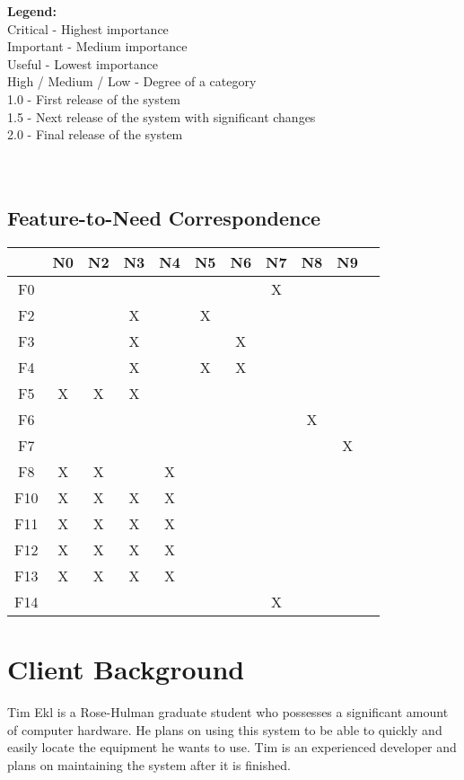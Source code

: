 \documentclass{article}
\begin{document}
\textbf{Legend:} \\
Critical - Highest importance \\
Important - Medium importance \\
Useful - Lowest importance \\
High / Medium / Low - Degree of a category \\
1.0 - First release of the system \\
1.5 - Next release of the system with significant changes \\
2.0 - Final release of the system \\
~\\
~\\
\subsection{Feature-to-Need Correspondence}
\begin{tabular}{ | c || c | c | c | c | c | c | c | c | c | c | }
\hline
    & N0 & N2 & N3 & N4 & N5 & N6 & N7 & N8 & N9 \\
\hline
\hline
F0  &    &    &    &    &    &    & X  &    &    \\
\hline
F2  &    &    & X  &    & X  &    &    &    &    \\
\hline
F3  &    &    & X  &    &    & X  &    &    &    \\
\hline
F4  &    &    & X  &    & X  & X  &    &    &    \\
\hline
F5  & X  & X  & X  &    &    &    &    &    &    \\
\hline
F6  &    &    &    &    &    &    &    & X  &    \\
\hline
F7  &    &    &    &    &    &    &    &    & X  \\
\hline
F8  & X  & X  &    & X  &    &    &    &    &    \\
\hline
F10 & X  & X  & X  & X  &    &    &    &    &    \\
\hline
F11 & X  & X  & X  & X  &    &    &    &    &    \\
\hline
F12 & X  & X  & X  & X  &    &    &    &    &    \\
\hline
F13 & X  & X  & X  & X  &    &    &    &    &    \\
\hline
F14 &    &    &    &    &    &    & X  &    &    \\
\hline
\end{tabular}

\section{Client Background}
Tim Ekl is a Rose-Hulman graduate student who possesses a significant amount of computer hardware.  He plans on using this system to be able to quickly and easily locate the equipment he wants to use.  Tim is an experienced developer and plans on maintaining the system after it is finished.  
\end{document}
